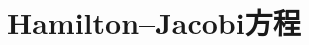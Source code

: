 \documentclass[../main.tex]{subfiles}
\begin{document}
\chapter{Hamilton--Jacobi方程}\label{chapter:ch10-HamiltonJacobi方程}






\end{document}
